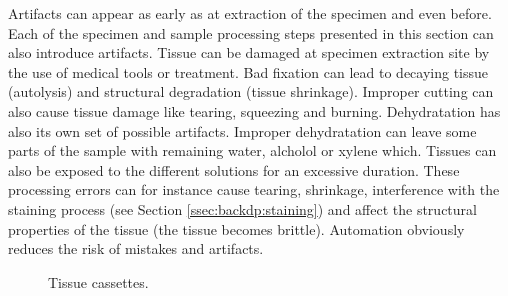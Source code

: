 Artifacts can appear as early as at extraction of the specimen and even before. Each of the specimen and sample processing steps presented in this section can also introduce artifacts. Tissue can be damaged at specimen extraction site by the use of medical tools or treatment. Bad fixation can lead to decaying tissue (\ie autolysis) and structural degradation (\eg tissue shrinkage). Improper cutting can also cause tissue damage like tearing, squeezing and burning. Dehydratation has also its own set of possible artifacts. Improper dehydratation can leave some parts of the sample with remaining water, alcholol or xylene which. Tissues can also be exposed to the different solutions for an excessive duration. These processing errors can for instance cause tearing, shrinkage, interference with the staining process (see Section \ref{ssec:backdp:staining}) and affect the structural properties of the tissue (\eg the tissue becomes brittle). Automation obviously reduces the risk of mistakes and artifacts.


  
    

\begin{figure}
  \centering
  \quad
  \caption{Tissue cassettes.}
\end{figure}

